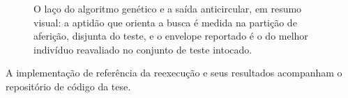 \begin{figure}[htbp]
    \centering
    
    \caption{O laço do algoritmo genético e a saída anticircular, em resumo
    visual: a aptidão que orienta a busca é medida na partição de aferição,
    disjunta do teste, e o envelope reportado é o do melhor indivíduo
    reavaliado no conjunto de teste intocado.}
    \label{fig:ap-ag-laco}
\end{figure}

A implementação de referência da reexecução e seus resultados acompanham o
repositório de código da tese.
